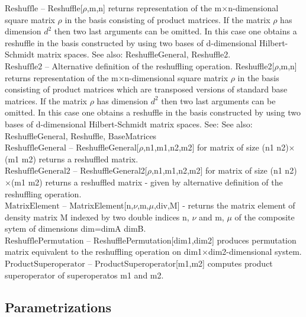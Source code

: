 \noindent\textbf{$ \text{Reshuffle} $ }-- Reshuffle[$\rho $,m,n] returns representation of the m$\times $n-dimensional square matrix $\rho $ in the basis consisting of product matrices. If  the matrix $\rho $ has dimension $ d^2 $ then two last arguments can be omitted. In this case one obtains a reshuffle in the basis constructed by using two bases of d-dimensional Hilbert-Schmidt matrix spaces. See also: ReshuffleGeneral, Reshuffle2.$  $\\

\noindent\textbf{$ \text{Reshuffle2} $ }-- Alternative definition of the reshuffling operation. Reshuffle2[$\rho $,m,n] returns representation of the m$\times $n-dimensional square matrix $\rho $ in the basis consisting of product matrices which are transposed versions of standard base matrices. If the matrix $\rho $ has dimension $ d^2 $ then two last arguments can be omitted. In this case one obtains a reshuffle in the basis constructed by using two bases of d-dimensional Hilbert-Schmidt matrix spaces. See: See also: ReshuffleGeneral, Reshuffle, BaseMatrices$  $\\

\noindent\textbf{$ \text{ReshuffleGeneral} $ }-- ReshuffleGeneral[$\rho $,n1,m1,n2,m2] for matrix of size (n1 n2)$\times $(m1 m2) returns a reshuffled matrix.$  $\\

\noindent\textbf{$ \text{ReshuffleGeneral2} $ }-- ReshuffleGeneral2[$\rho $,n1,m1,n2,m2] for matrix of size (n1 n2)$\times $(m1 m2) returns a reshuffled matrix - given by alternative definition of the reshuffling operation.$  $\\

\noindent\textbf{$ \text{MatrixElement} $ }-- MatrixElement[n,$\nu $,m,$\mu $,div,M] - returns the matrix element of density matrix M indexed by two double indices n, $\nu $ and m, $\mu $ of the composite sytem of dimensions dim=dimA dimB.$  $\\

\noindent\textbf{$ \text{ReshufflePermutation} $ }-- ReshufflePermutation[dim1,dim2] produces permutation matrix equivalent to the reshuffling operation on dim1$\times $dim2-dimensional system.$  $\\

\noindent\textbf{$ \text{ProductSuperoperator} $ }-- ProductSuperoperator[m1,m2] computes product superoperator of superoperatos m1 and m2.$  $\\

\subsection{Parametrizations}

